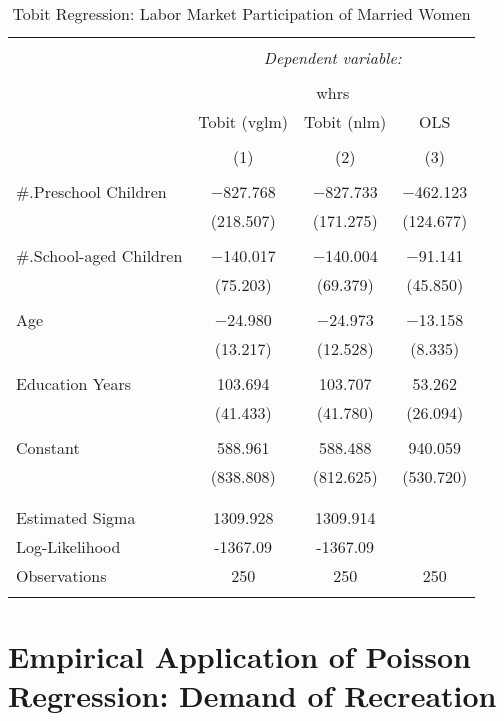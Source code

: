 \documentclass[
  12pt,
]{article}
\begin{document}
\begin{table}[t] \centering 
  \caption{Tobit Regression: Labor Market Participation of Married Women} 
  \label{lfp_tobit} 
\begin{tabular}{@{\extracolsep{5pt}}lccc} 
\\[-1.8ex]\hline 
\hline \\[-1.8ex] 
 & \multicolumn{3}{c}{\textit{Dependent variable:}} \\ 
\cline{2-4} 
\\[-1.8ex] & \multicolumn{3}{c}{whrs} \\ 
 & Tobit (vglm) & Tobit (nlm) & OLS \\ 
\\[-1.8ex] & (1) & (2) & (3)\\ 
\hline \\[-1.8ex] 
 \#.Preschool Children & $-$827.768 & $-$827.733 & $-$462.123 \\ 
  & (218.507) & (171.275) & (124.677) \\ 
  & & & \\ 
 \#.School-aged Children & $-$140.017 & $-$140.004 & $-$91.141 \\ 
  & (75.203) & (69.379) & (45.850) \\ 
  & & & \\ 
 Age & $-$24.980 & $-$24.973 & $-$13.158 \\ 
  & (13.217) & (12.528) & (8.335) \\ 
  & & & \\ 
 Education Years & 103.694 & 103.707 & 53.262 \\ 
  & (41.433) & (41.780) & (26.094) \\ 
  & & & \\ 
 Constant & 588.961 & 588.488 & 940.059 \\ 
  & (838.808) & (812.625) & (530.720) \\ 
  & & & \\ 
\hline \\[-1.8ex] 
Estimated Sigma & 1309.928 & 1309.914 &  \\ 
Log-Likelihood & -1367.09 & -1367.09 &  \\ 
Observations & 250 & 250 & 250 \\ 
\hline 
\hline \\[-1.8ex] 
\end{tabular} 
\end{table}

\clearpage

\hypertarget{empirical-application-of-poisson-regression-demand-of-recreation}{%
\section{Empirical Application of Poisson Regression: Demand of
Recreation}\label{empirical-application-of-poisson-regression-demand-of-recreation}}
\end{document}
